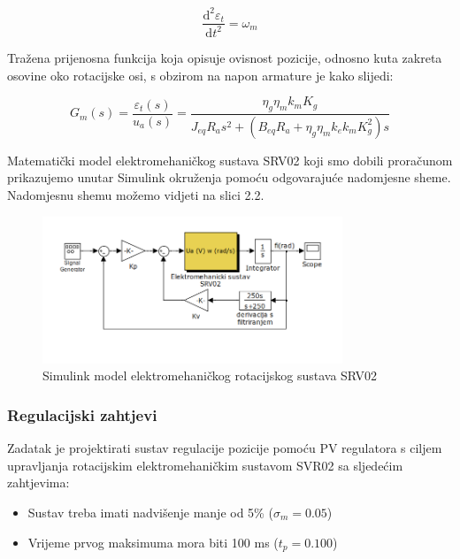 \documentclass[12pt,a4paper]{article}
\begin{document}
\begin{equation}
\frac{\mathrm{d}^2\varepsilon_t}{\mathrm{d}t^2} = \omega_m
\end{equation}
\newpage


Tražena prijenosna funkcija koja opisuje ovisnost pozicije, odnosno kuta zakreta osovine oko rotacijske osi, s obzirom na napon armature je kako slijedi:

\begin{equation}
G_m(s)=\frac{\varepsilon_t(s)}{u_a(s)}=\frac{\eta_g\eta_mk_mK_g}{J_{eq}R_as^2 + (B_{eq}R_a+\eta_g\eta_mk_ek_mK_g^2)s}
\end{equation}

Matematički model elektromehaničkog sustava SRV02 koji smo dobili proračunom prikazujemo unutar Simulink okruženja pomoću odgovarajuće nadomjesne sheme. Nadomjesnu shemu možemo vidjeti na slici 2.2.

\begin{figure}[h]
	\begin{center}
	\includegraphics[width=0.8\textwidth] {nadomjesni_model.png}
    \caption{Simulink model elektromehaničkog rotacijskog sustava SRV02}
    \end{center}
\end{figure}

\subsubsection{Regulacijski zahtjevi}
\label{sec:zahtjevi}
Zadatak je projektirati sustav regulacije pozicije pomoću PV regulatora s ciljem upravljanja rotacijskim elektromehaničkim sustavom SVR02 sa sljedećim zahtjevima:

\begin{itemize}
  \item Sustav treba imati nadvišenje manje od 5\% ($\sigma_m = 0.05$)
  \item Vrijeme prvog maksimuma mora biti 100 ms ($t_p = 0.100$)
  
\end{itemize}
\end{document}
